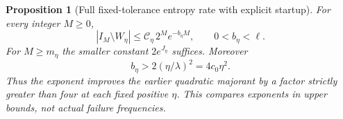 \documentclass[11pt]{article}
\newtheorem{proposition}{Proposition}
\theoremstyle{remark}\newtheorem{remark}[proposition]{Remark}
\begin{document}
\begin{proposition}[Full fixed-tolerance entropy rate with explicit startup]
\label{prop:shaik-full-entropy}
For every integer \(M\ge0\),
\begin{equation}\label{eq:shaik-full-entropy-shell}
 |I_M\setminus W_\eta|
 \le \mathcal C_\eta\,2^M e^{-b_\eta M},
 \qquad 0<b_\eta<\ell .
\end{equation}
For \(M\ge m_\eta\) the smaller constant \(2e^{J_\eta}\) suffices.
Moreover
\begin{equation}\label{eq:shaik-entropy-quadratic-comparison}
 b_\eta>2(\eta/\lambda)^2=4c_0\eta^2 .
\end{equation}
Thus the exponent improves the earlier quadratic majorant by a factor
strictly greater than four at each fixed positive \(\eta\).
This compares exponents in upper bounds, not actual failure frequencies.
\end{proposition}
\end{document}
